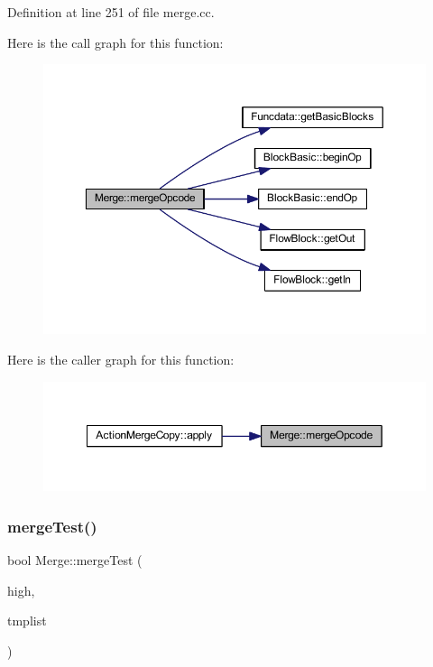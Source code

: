 Definition at line 251 of file merge.\+cc.

Here is the call graph for this function\+:
\nopagebreak
\begin{figure}[H]
\begin{center}
\leavevmode
\includegraphics[width=350pt]{class_merge_a55762a93af96a7e8abab70b169302b59_cgraph}
\end{center}
\end{figure}
Here is the caller graph for this function\+:
\nopagebreak
\begin{figure}[H]
\begin{center}
\leavevmode
\includegraphics[width=349pt]{class_merge_a55762a93af96a7e8abab70b169302b59_icgraph}
\end{center}
\end{figure}
\mbox{\label{class_merge_a819c900aaa428a745faa59335bf0b69e}} 
\subsubsection{\texorpdfstring{mergeTest()}{mergeTest()}}
{\footnotesize\ttfamily bool Merge\+::merge\+Test (\begin{DoxyParamCaption}\item[{\mbox{\hyperlink{class_high_variable}{High\+Variable}} $\ast$}]{high,  }\item[{vector$<$ \mbox{\hyperlink{class_high_variable}{High\+Variable}} $\ast$ $>$ \&}]{tmplist }\end{DoxyParamCaption})}



